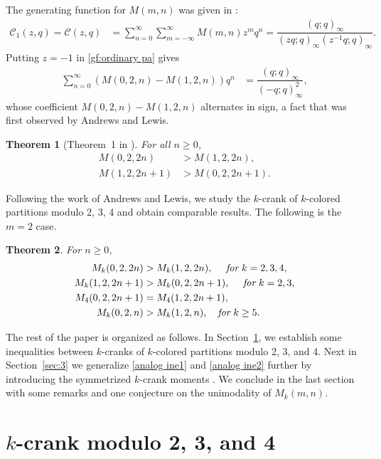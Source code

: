 \documentclass[12pt]{amsart}
\numberwithin{equation}{section}
\theoremstyle{plain}
\newtheorem{theorem}{Theorem}[section]
\theoremstyle{definition}
\begin{document}
The generating function for $M(m,n)$ was given in \cite{A-G,Gar1}:
\begin{align}\label{gf:ordinary pa}
\mathcal{C}_1(z,q)=\mathcal{C}(z,q) &=\sum_{n=0}^{\infty}\sum_{m=-\infty}^{\infty}M(m,n)z^{m}q^{n}=\dfrac{(q;q)_{\infty}}{(zq;q)_{\infty}(z^{-1}q;q)_{\infty}}.
\end{align}
Putting $z=-1$ in \eqref{gf:ordinary pa} gives
\begin{align*}
\sum_{n=0}^{\infty}\left(M(0,2,n)-M(1,2,n)\right)q^{n} &=\dfrac{(q;q)_{\infty}}{(-q;q)_{\infty}^{2}},
\end{align*}
whose coefficient $M(0,2,n)-M(1,2,n)$ alternates in sign, a fact that was first observed by Andrews and Lewis.
\begin{theorem}[Theorem~1 in \cite{AL}]\label{parity results}
For all $n\geq0$,
\begin{align*}
M(0,2,2n) &>M(1,2,2n),\\
M(1,2,2n+1) &>M(0,2,2n+1).
\end{align*}
\end{theorem}

Following the work of Andrews and Lewis, we study the $k$-crank of $k$-colored partitions modulo 2, 3, 4 and obtain comparable results. The following is the $m=2$ case.
\begin{theorem}\label{thm:alternate thm}
For $n\geq0$,
\begin{align}
M_{k}(0,2,2n) &>M_{k}(1,2,2n),\quad~\emph{for}~k=2,3,4,\label{analog ine1}\\
M_{k}(1,2,2n+1) &>M_{k}(0,2,2n+1),\quad~\emph{for}~k=2,3,\label{analog ine2}\\
M_{4}(0,2,2n+1) &= M_{4}(1,2,2n+1), \label{strict iden1}\\
M_{k}(0,2,n) &> M_{k}(1,2,n), \quad \emph{for}~k\geq5.\label{analog ine3}
\end{align}
\end{theorem}


The rest of the paper is organized as follows. In Section~\ref{sec:2}, we establish some inequalities between $k$-cranks of $k$-colored partitions modulo 2, 3, and 4. Next in Section~\ref{sec:3} we generalize \eqref{analog ine1} and \eqref{analog ine2} further by introducing the symmetrized $k$-crank moments . We conclude in the last section with some remarks and one conjecture on the unimodality of $M_k(m,n)$.


\section{$k$-crank modulo 2, 3, and 4}\label{sec:2}
\end{document}
